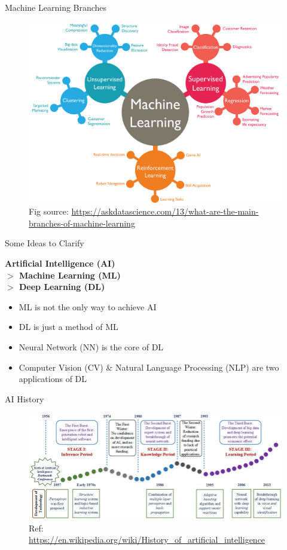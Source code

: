 \documentclass{../TexTemplate/myslide}
\begin{document}
\begin{frame}{Machine Learning Branches}
\begin{figure}[H]
\centering
\includegraphics[width=0.8\linewidth]{fig/ml_branches.png}
\caption*{\small Fig source: \url{https://askdatascience.com/13/what-are-the-main-branches-of-machine-learning}}
\end{figure}
\end{frame}

\begin{frame}{Some Ideas to Clarify}
\begin{center}
\textbf{Artificial Intelligence (AI)\\
\qquad $>$ Machine Learning (ML)\\
\qquad\qquad $>$ Deep Learning (DL)}
\end{center}
\begin{itemize}
	\item ML is not the only way to achieve AI
	\item DL is just a method of ML
	\item Neural Network (NN) is the core of DL
	\item Computer Vision (CV) \& Natural Language Processing (NLP) are two applications of DL
\end{itemize}
\end{frame}

\begin{frame}{AI History}
\begin{figure}
\centering
\includegraphics[width=\linewidth]{fig/AI-history.jpg}
\caption*{\small Ref: \url{https://en.wikipedia.org/wiki/History_of_artificial_intelligence}}
\end{figure}
\end{frame}
\end{document}

